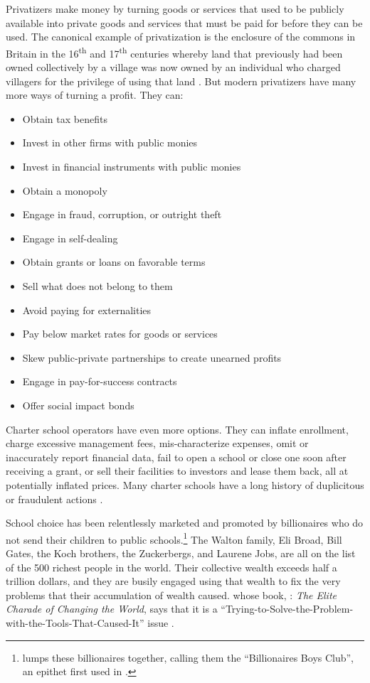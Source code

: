 Privatizers make money by turning goods or services that used to be publicly available into private goods and services that must be paid for before they can be used. The canonical example of privatization is the enclosure of the commons in Britain in the 16\textsuperscript{th} and 17\textsuperscript{th} centuries whereby land that previously had been owned collectively by a village was now owned by an individual who charged villagers for the privilege of using that land \parencite{SimonFairlie2009}. But modern privatizers have many more ways of turning a profit. They can:
\begin{itemize}
  \item Obtain tax benefits
  \item Invest in other firms with public monies
  \item Invest in financial instruments with public monies
  \item Obtain a monopoly
  \item Engage in fraud, corruption, or outright theft
  \item Engage in self-dealing
  \item Obtain grants or loans on favorable terms
  \item Sell what does not belong to them
  \item Avoid paying for externalities
  \item Pay below market rates for goods or services
  \item Skew public-private partnerships to create unearned profits
  \item Engage in pay-for-success contracts
  \item Offer social impact bonds
\end{itemize}

Charter school operators have even more options. They can inflate enrollment, charge excessive management fees, mis-characterize expenses, omit or inaccurately report financial data, fail to open a school or close one soon after receiving a grant, or sell their facilities to investors and lease them back, all at potentially inflated prices. Many charter schools have a long history of duplicitous or fraudulent actions \parencite{ITPT2018, Burris.Bryant2020, Baker.Miron2015}.

School choice has been relentlessly marketed and promoted by billionaires who do not send their children to public schools.\footnote{\textcite{Ravitch2010} lumps these billionaires together, calling them the ``Billionaires  Boys Club'', an epithet first used in .} The Walton family, Eli Broad, Bill Gates, the Koch brothers, the Zuckerbergs, and Laurene Jobs, are all on the list of the 500 richest people in the world. Their collective wealth exceeds half a trillion dollars, and they are busily engaged using that wealth to fix the very problems that their accumulation of wealth caused. \textcite{Giridharadas2018} whose book, : \textit{The Elite Charade of Changing the World}, says that it is a ``Trying-to-Solve-the-Problem-with-the-Tools-That-Caused-It'' issue \parencite[142]{Giridharadas2018}.

